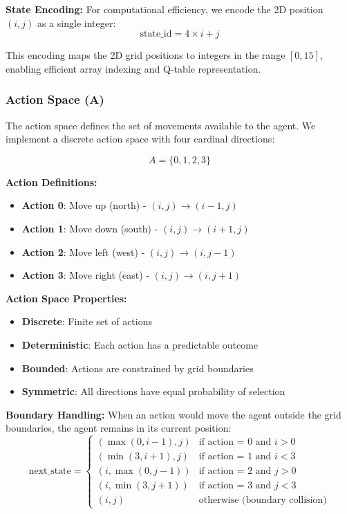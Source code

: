 \documentclass[12pt]{article}
\begin{document}
{{{\textbf{State Encoding:}
For computational efficiency, we encode the 2D position $(i, j)$ as a single integer:
\begin{equation}
\text{state\_id} = 4 \times i + j
\end{equation}

This encoding maps the 2D grid positions to integers in the range $[0, 15]$, enabling efficient array indexing and Q-table representation.

\subsubsection{Action Space (A)}

The action space defines the set of movements available to the agent. We implement a discrete action space with four cardinal directions:

\begin{equation}
A = \{0, 1, 2, 3\}
\end{equation}

\textbf{Action Definitions:}
\begin{itemize}
    \item \textbf{Action 0}: Move up (north) - $(i, j) \rightarrow (i-1, j)$
    \item \textbf{Action 1}: Move down (south) - $(i, j) \rightarrow (i+1, j)$
    \item \textbf{Action 2}: Move left (west) - $(i, j) \rightarrow (i, j-1)$
    \item \textbf{Action 3}: Move right (east) - $(i, j) \rightarrow (i, j+1)$
\end{itemize}

\textbf{Action Space Properties:}
\begin{itemize}
    \item \textbf{Discrete}: Finite set of actions
    \item \textbf{Deterministic}: Each action has a predictable outcome
    \item \textbf{Bounded}: Actions are constrained by grid boundaries
    \item \textbf{Symmetric}: All directions have equal probability of selection
\end{itemize}

\textbf{Boundary Handling:}
When an action would move the agent outside the grid boundaries, the agent remains in its current position:
\begin{equation}
\text{next\_state} = \begin{cases}
(\max(0, i-1), j) & \text{if action = 0 and } i > 0 \\
(\min(3, i+1), j) & \text{if action = 1 and } i < 3 \\
(i, \max(0, j-1)) & \text{if action = 2 and } j > 0 \\
(i, \min(3, j+1)) & \text{if action = 3 and } j < 3 \\
(i, j) & \text{otherwise (boundary collision)}
\end{cases}
\end{equation}

}}}
\end{document}

